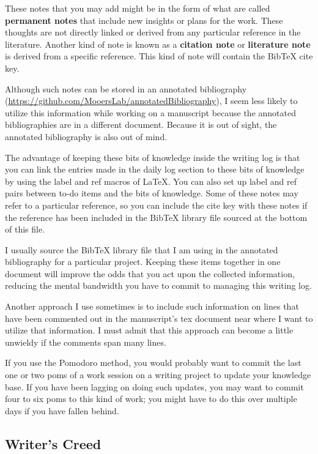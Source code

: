 \documentclass[11pt,letterpaper]{article}
\begin{document}
These notes that you may add might be in the form of what are called
\textbf{permanent notes} that include new insights or plans for the work. These
thoughts are not directly linked or derived from any particular
reference in the literature. Another kind of note is known as a
\textbf{citation note} or \textbf{literature note} is derived from a specific
reference. This kind of note will contain the BibTeX cite key.

Although such notes can be stored in an annotated bibliography
(\url{https://github.com/MooersLab/annotatedBibliography}), I seem less likely
to utilize this information while working on a manuscript because the
annotated bibliographies are in a different document. Because it is out
of sight, the annotated bibliography is also out of mind.

The advantage of keeping these bits of knowledge inside the writing log
is that you can link the entries made in the daily log section to these
bits of knowledge by using the label and ref macros of \LaTeX{}. You can
also set up label and ref pairs between to-do items and the bits of
knowledge. Some of these notes may refer to a particular reference, so
you can include the cite key with these notes if the reference has been
included in the BibTeX library file sourced at the bottom of this file.

I usually source the BibTeX library file that I am using in the
annotated bibliography for a particular project. Keeping these items
together in one document will improve the odds that you act upon the
collected information, reducing the mental bandwidth you have to commit
to managing this writing log.

Another approach I use sometimes is to include such information on lines
that have been commented out in the manuscript's tex document near where
I want to utilize that information. I must admit that this approach can
become a little unwieldy if the comments span many lines.

If you use the Pomodoro method, you would probably want to commit the
last one or two poms of a work session on a writing project to update
your knowledge base. If you have been lagging on doing such updates, you
may want to commit four to six poms to this kind of work; you might have
to do this over multiple days if you have fallen behind.




\subsection{Writer's Creed}
\label{sec:orga5fafd6}
\end{document}
